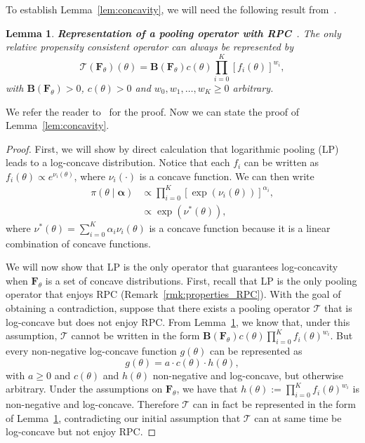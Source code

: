 \documentclass[a4paper, notitlepage, 10pt]{article}
\newtheorem{lemma}{Lemma}[]
\begin{document}
To establish Lemma~\ref{lem:concavity}, we will need the following result from~\cite{Genest1984}.
\begin{lemma}
\label{lem:RPC_representation}
\textbf{Representation of a pooling operator with RPC}~\citep[eq. 3.1]{Genest1984}.
The only relative propensity consistent operator can always be represented by
\[ \mathcal{T} \left( \boldsymbol F_\theta \right)(\theta) = \boldsymbol B\left( \boldsymbol F_\theta \right) c(\theta) \prod_{i=0}^K \left[f_i(\theta) \right]^{w_i},\]
with $\boldsymbol B\left( \boldsymbol F_\theta \right) > 0$, $c(\theta) >0$  and $w_0, w_1, \ldots, w_K \geq 0$ arbitrary. 
\end{lemma}
We refer the reader to~\cite{Genest1984} for the proof.
Now we can state the proof of Lemma~\ref{lem:concavity}.
\begin{proof}
First, we will show by direct calculation that logarithmic pooling (LP) leads to a log-concave distribution.
Notice that each $f_i$ can be written as $ f_i(\theta) \propto e^{\nu_i(\theta)}$, where $\nu_i(\cdot)$ is a concave function.
We can then write
\begin{align*}
 \pi(\theta \mid \boldsymbol \alpha) &\propto \prod_{i=0}^{K} [\exp(\nu_i(\theta))]^{\alpha_i},\\
             &\propto \exp(\nu^{\ast}(\theta)),
\end{align*}
 where $\nu^{\ast}(\theta) = \sum_{i=0}^{K}\alpha_i\nu_i(\theta)$ is a concave function because it is a linear combination of concave functions.
 
We will now show that LP is the only operator that guarantees log-concavity when $\boldsymbol F_\theta$ is a set of concave distributions.
First, recall that LP is the only pooling operator that enjoys RPC (Remark~\ref{rmk:properties_RPC}).
With the goal of obtaining a contradiction, suppose that there exists a pooling operator $\mathcal{T}$ that is log-concave but does not enjoy RPC.
 From Lemma~\ref{lem:RPC_representation}, we know that, under this assumption, $\mathcal{T}$ cannot be written in the form $\boldsymbol B(\boldsymbol F_\theta) c(\theta) \prod_{i=0}^K f_i(\theta)^{w_i} $.
But every non-negative log-concave function $g(\theta)$ can be represented as
 \begin{equation}
 \label{eq:lc_rep}
  g(\theta) = a \cdot c(\theta) \cdot h(\theta),
 \end{equation}
with $a \geq 0$ and $c(\theta)$ and $h(\theta)$ non-negative and log-concave, but otherwise arbitrary.
Under the assumptions on $\boldsymbol F_\theta$, we have that $h(\theta) := \prod_{i=0}^K f_i(\theta)^{w_i}$ is non-negative and log-concave.
Therefore $\mathcal{T}$ can in fact be represented in the form of Lemma~\ref{lem:RPC_representation}, contradicting our initial assumption that $\mathcal{T}$ can at same time be log-concave but not enjoy RPC.  
\end{proof}
\end{document}
